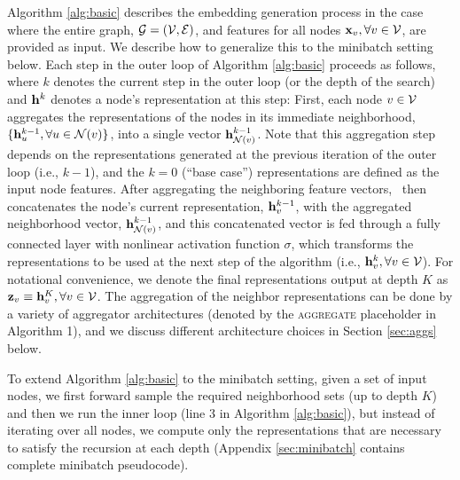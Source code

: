 Algorithm \ref{alg:basic} describes the embedding generation process in the case where the entire graph, $\mathcal{G}=(\mathcal{V}, \mathcal{E})$,  and features  for all nodes $\mathbf{x}_v, \forall v \in \mathcal{V}$, are provided as input.
We describe how to generalize this to the minibatch setting below. 
Each step in the outer loop of Algorithm \ref{alg:basic} proceeds as follows, where $k$ denotes the current step in the outer loop (or the depth of the search) and $\mathbf{h}^{k}$ denotes a node's representation at this step: First, each node $v\in\mathcal{V}$ aggregates the representations of the nodes in its immediate neighborhood, $\{\mathbf{h}^{k-1}_u, \forall u \in \mathcal{N}(v)\}$, into a single vector $\mathbf{h}^{k-1}_{\mathcal{N}(v)}$. 
Note that this aggregation step depends on the representations generated at the previous iteration of the outer loop (i.e., $k-1$),  and the $k=0$ (``base case'') representations are defined as the input node features. 
After aggregating the neighboring feature vectors, \name\ then concatenates the node's current representation, $\mathbf{h}_v^{k-1}$, with the aggregated neighborhood vector, $\mathbf{h}^{k-1}_{\mathcal{N}(v)}$, and this concatenated vector is fed through a fully connected layer with nonlinear activation function $\sigma$, which transforms the representations to be used at the next step of the algorithm (i.e.,  $ \mathbf{h}_v^{k}, \forall v \in \mathcal{V}$). 
For notational convenience, we denote the final representations output at depth $K$ as $\mathbf{z}_v \equiv \mathbf{h}^K_v , \forall v \in \mathcal{V}$.
The aggregation of the neighbor representations can be done by a variety of aggregator architectures (denoted by the \textsc{aggregate} placeholder in Algorithm 1), and we discuss different architecture choices in Section \ref{sec:aggs} below.


To extend Algorithm \ref{alg:basic} to the minibatch setting, given a set of input nodes, we first forward sample the required neighborhood sets (up to depth $K$) and then we run the inner loop (line 3 in Algorithm \ref{alg:basic}), but instead of iterating over all nodes, we compute only the representations that are necessary to satisfy the recursion at each depth (Appendix \ref{sec:minibatch} contains complete minibatch pseudocode).

